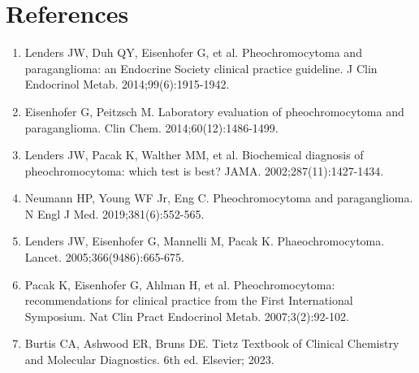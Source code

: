 \section*{References}
\begin{enumerate}
  \item Lenders JW, Duh QY, Eisenhofer G, et al. Pheochromocytoma and paraganglioma: an Endocrine Society clinical practice guideline. J Clin Endocrinol Metab. 2014;99(6):1915-1942.
  \item Eisenhofer G, Peitzsch M. Laboratory evaluation of pheochromocytoma and paraganglioma. Clin Chem. 2014;60(12):1486-1499.
  \item Lenders JW, Pacak K, Walther MM, et al. Biochemical diagnosis of pheochromocytoma: which test is best? JAMA. 2002;287(11):1427-1434.
  \item Neumann HP, Young WF Jr, Eng C. Pheochromocytoma and paraganglioma. N Engl J Med. 2019;381(6):552-565.
  \item Lenders JW, Eisenhofer G, Mannelli M, Pacak K. Phaeochromocytoma. Lancet. 2005;366(9486):665-675.
  \item Pacak K, Eisenhofer G, Ahlman H, et al. Pheochromocytoma: recommendations for clinical practice from the First International Symposium. Nat Clin Pract Endocrinol Metab. 2007;3(2):92-102.
  \item Burtis CA, Ashwood ER, Bruns DE. Tietz Textbook of Clinical Chemistry and Molecular Diagnostics. 6th ed. Elsevier; 2023.
\end{enumerate}

\clearpage
